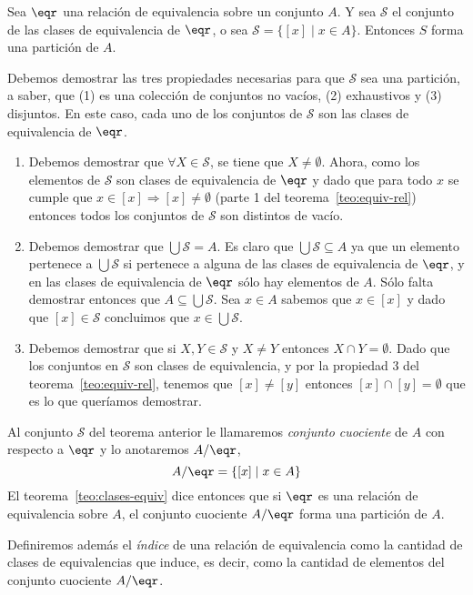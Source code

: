 \begin{teorema}
\label{teo:clases-equiv}
Sea $\eqr$ una relación de equivalencia sobre un conjunto $A$.
Y sea $\mathcal S$ el conjunto de las clases de equivalencia de $\eqr$, o sea $\mathcal S=\{[x]\;|\;x\in A\}$.
Entonces $S$ forma una partición de $A$.

\begin{demostracion}
Debemos demostrar las tres propiedades necesarias para que $\mathcal S$ sea una partición, a saber, que (1) es una colección de conjuntos no vacíos, (2) exhaustivos y (3) disjuntos.
En este caso, cada uno de los conjuntos de $\mathcal S$ son las clases de equivalencia de $\eqr$.
\begin{enumerate}
  \vspace*{-\topsep}
  \itemsep 0pt
  \item Debemos demostrar que $\forall X\in\mathcal S$, se tiene que $X\not=\emptyset$.
  Ahora, como los elementos de $\mathcal S$ son clases de equivalencia de $\eqr$ y dado que para todo $x$ se cumple que $x\in[x]\Rightarrow [x]\not=\emptyset$ (parte 1 del teorema~\ref{teo:equiv-rel}) entonces todos los conjuntos de $\mathcal S$ son distintos de vacío.
  \item Debemos demostrar que $\bigcup\mathcal S=A$.
  Es claro que $\bigcup\mathcal S\subseteq A$ ya que un elemento pertenece a $\bigcup\mathcal S$ si  pertenece a alguna de las clases de equivalencia de $\eqr$, y en las clases de equivalencia de $\eqr$ sólo hay elementos de $A$.
  Sólo falta demostrar entonces que $A\subseteq\bigcup\mathcal S$.
  Sea $x\in A$ sabemos que $x\in[x]$ y dado que $[x]\in\mathcal S$ concluimos que $x\in\bigcup\mathcal S$.
  \item Debemos demostrar que si $X,Y\in\mathcal S$ y $X\not=Y$ entonces $X\cap Y=\emptyset$.
  Dado que los conjuntos en $\mathcal S$ son clases de equivalencia, y por la propiedad 3 del teorema~\ref{teo:equiv-rel}, tenemos que $[x]\not=[y]$ entonces $[x]\cap[y]=\emptyset$ que es lo que queríamos demostrar.
\end{enumerate}
\end{demostracion}
\end{teorema}

\begin{definicion}
Al conjunto $\mathcal S$ del teorema anterior le llamaremos \emph{conjunto cuociente} de $A$ con respecto a $\eqr$ y lo anotaremos $A/\eqr$,
\[
A/\eqr=\{[x]\;|\;x\in A\}
\]
El teorema~\ref{teo:clases-equiv} dice entonces que si $\eqr$ es una relación de equivalencia sobre $A$, el conjunto cuociente $A/\eqr$ forma una partición de $A$.

Definiremos además el \emph{índice} de una relación de equivalencia como la cantidad de clases de equivalencias que induce, es decir, como la cantidad de elementos del conjunto cuociente $A/\eqr$.
\end{definicion}

